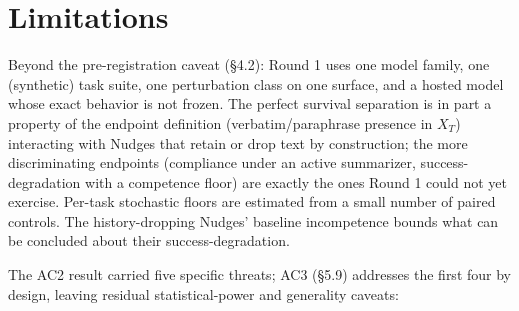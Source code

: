 \documentclass{article}
\theoremstyle{plain}
\theoremstyle{definition}
\begin{document}
\section{Limitations}

Beyond the pre-registration caveat (§4.2): Round 1 uses one model family, one (synthetic) task suite, one perturbation class on one surface, and a hosted model whose exact behavior is not frozen. The perfect survival separation is in part a property of the endpoint definition (verbatim/paraphrase presence in $X_T$) interacting with Nudges that retain or drop text by construction; the more discriminating endpoints (compliance under an active summarizer, success-degradation with a competence floor) are exactly the ones Round 1 could not yet exercise. Per-task stochastic floors are estimated from a small number of paired controls. The history-dropping Nudges' baseline incompetence bounds what can be concluded about their success-degradation.

The AC2 result carried five specific threats; AC3 (§5.9) addresses the first four by design, leaving residual statistical-power and generality caveats:
\end{document}
